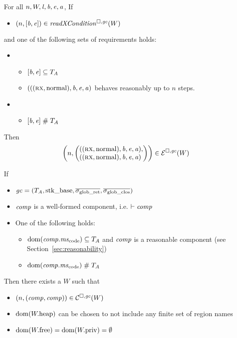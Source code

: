 \documentclass[acmsmall,review,anonymous]{acmart}\settopmatter{printfolios=true,printccs=false,printacmref=false}
\renewcommand{\comp}{\var{comp}}
\newcommand{\wdjud}[2][ ]{#1 \vdash #2}
\begin{document}
\begin{theorem}[FTLR]
  \label{thm:ftlr}
  For all $n,W,\mathit{l},\mathit{b},\mathit{e},\mathit{a}$,
  If
  \begin{itemize}
  \item $\npair{[\baddr,\eaddr]} \in \xReadCond{W}$
  \end{itemize}
  and one of the following sets of requirements holds:
  \begin{itemize}
  \item \begin{itemize}
    \item $[\mathit{b},\mathit{e}] \subseteq T_{A}$
    \item $({((\textsc{rx},\mathrm{normal}),\mathit{b},\mathit{e},\mathit{a})}$ behaves reasonably up to $n$ steps.
    \end{itemize}
  \item
    \begin{itemize}
    \item $[\mathit{b},\mathit{e}] \mathrel{\#} T_{A}$
    \end{itemize}
  \end{itemize}
  Then
  \[
    \npair{\left(\arraycolsep=0pt\array{l}((\rx,\normal),\baddr,\eaddr,\aaddr),\\
      ((\rx,\normal),\baddr,\eaddr,\aaddr)\endarray\right)} \in \lre(W)
  \]
\end{theorem}

\begin{lemma}
  \label{lem:ftlr-comps}
  If
  \begin{itemize}
  \item $\mathit{gc} = (T_{A},\mathrm{stk\_base},\overline{\sigma_{\mathrm{glob\_ret}}},\overline{\sigma_{\mathrm{glob\_clos}}})$
  \item $\comp$ is a well-formed component, i.e. $\wdjud{\comp}$
  \item One of the following holds:
    \begin{itemize}
    \item $\dom(\comp.\mscode) \subseteq \ta$ and $\comp$ is a reasonable component (see Section~\ref{sec:reasonability})
    \item $\dom(\comp.\mscode) \mathrel{\#} \ta$
    \end{itemize}
  \end{itemize}
  Then there exists a $W$ such that
  \begin{itemize}
  \item $\npair{(\comp,\comp)} \in \lrcomp(W)$
  \item $\mathrm{dom}(W.\mathrm{heap})$ can be chosen to not include any finite set of region names 
  \item $\mathrm{dom}(W.\mathrm{free}) =
    \mathrm{dom}(W.\mathrm{priv})=\emptyset$
  \end{itemize}
\end{lemma}
\end{document}
